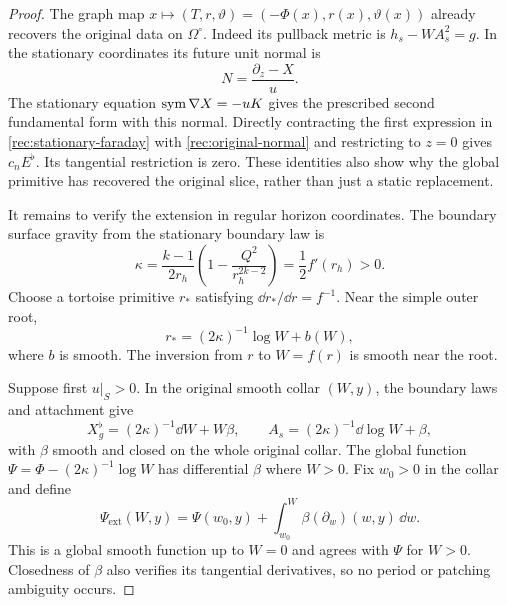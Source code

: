 \begin{proof}
The graph map $x\mapsto(T,r,\vartheta)=(-\Phi(x),r(x),\vartheta(x))$
already recovers the original data on $\Omega^\circ$. Indeed its
pullback metric is $h_s-W A_s^2=g$. In the stationary coordinates
its future unit normal is
\begin{equation}\label{rec:original-normal}
 N=\frac{\partial_z-X}{u}.
\end{equation}
The stationary equation $\operatorname{sym}\nabla X=-uK$ gives the prescribed
second fundamental form with this normal. Directly contracting the
first expression in \eqref{rec:stationary-faraday} with
\eqref{rec:original-normal} and restricting to $z=0$ gives
$c_nE^\flat$. Its tangential restriction is zero. These identities
also show why the global primitive has recovered the original
slice, rather than just a static replacement.

It remains to verify the extension in regular horizon coordinates.
The boundary surface gravity from the stationary boundary law is
\begin{equation}\label{rec:surface-gravity}
 \kappa=\frac{k-1}{2r_h}
                  \left(1-\frac{Q^2}{r_h^{2k-2}}\right)
        =\frac12 f'(r_h)>0.
\end{equation}
Choose a tortoise primitive $r_*$ satisfying
$\dd r_*/\dd r=f^{-1}$. Near the simple outer root,
\begin{equation}\label{rec:tortoise}
 r_*=(2\kappa)^{-1}\log W+b(W),
\end{equation}
where $b$ is smooth. The inversion from $r$ to $W=f(r)$ is smooth
near the root.

Suppose first $u|_S>0$. In the original smooth collar $(W,y)$,
the boundary laws and attachment give
\begin{equation}\label{rec:log-shift}
 X_g^\flat=(2\kappa)^{-1}\dd W+W\beta,
 \qquad
 A_s=(2\kappa)^{-1}\dd\log W+\beta,
\end{equation}
with $\beta$ smooth and closed on the whole original collar.
The global function
$\Psi=\Phi-(2\kappa)^{-1}\log W$ has differential $\beta$
where $W>0$. Fix $w_0>0$ in the collar and define
\[
 \Psi_{\mathrm{ext}}(W,y)=\Psi(w_0,y)
        +\int_{w_0}^{W}\beta(\partial_w)(w,y)\,\dd w.
\]
This is a global smooth function up to $W=0$ and agrees with
$\Psi$ for $W>0$. Closedness of $\beta$ also verifies its
tangential derivatives, so no period or patching ambiguity occurs.


\end{proof}
